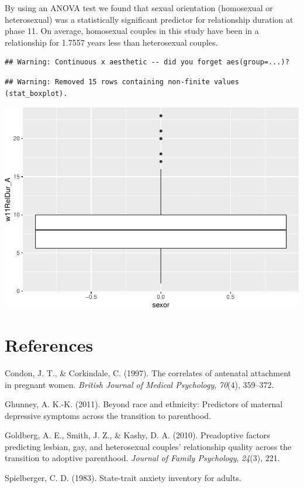 \documentclass[man]{apa6}
\begin{document}
By using an ANOVA test we found that sexual orientation (homosexual or heterosexual) was a statistically significant predictor for relationship duration at phase 11. On average, homosexual couples in this study have been in a relationship for 1.7557 years less than heterosexual couples.

\begin{verbatim}
## Warning: Continuous x aesthetic -- did you forget aes(group=...)?
\end{verbatim}

\begin{verbatim}
## Warning: Removed 15 rows containing non-finite values (stat_boxplot).
\end{verbatim}

\includegraphics{measures_descriptive_stats_files/figure-latex/unnamed-chunk-3-1.pdf}

\newpage

\hypertarget{references}{%
\section{References}\label{references}}

\begingroup
\setlength{\parindent}{-0.5in}
\setlength{\leftskip}{0.5in}

\hypertarget{refs}{}
\leavevmode\hypertarget{ref-condon1997correlates}{}%
Condon, J. T., \& Corkindale, C. (1997). The correlates of antenatal attachment in pregnant women. \emph{British Journal of Medical Psychology}, \emph{70}(4), 359--372.

\leavevmode\hypertarget{ref-ghunney2011beyond}{}%
Ghunney, A. K.-K. (2011). Beyond race and ethnicity: Predictors of maternal depressive symptoms across the transition to parenthood.

\leavevmode\hypertarget{ref-goldberg2010preadoptive}{}%
Goldberg, A. E., Smith, J. Z., \& Kashy, D. A. (2010). Preadoptive factors predicting lesbian, gay, and heterosexual couples' relationship quality across the transition to adoptive parenthood. \emph{Journal of Family Psychology}, \emph{24}(3), 221.

\leavevmode\hypertarget{ref-spielberger1983state}{}%
Spielberger, C. D. (1983). State-trait anxiety inventory for adults.

\endgroup
\end{document}
